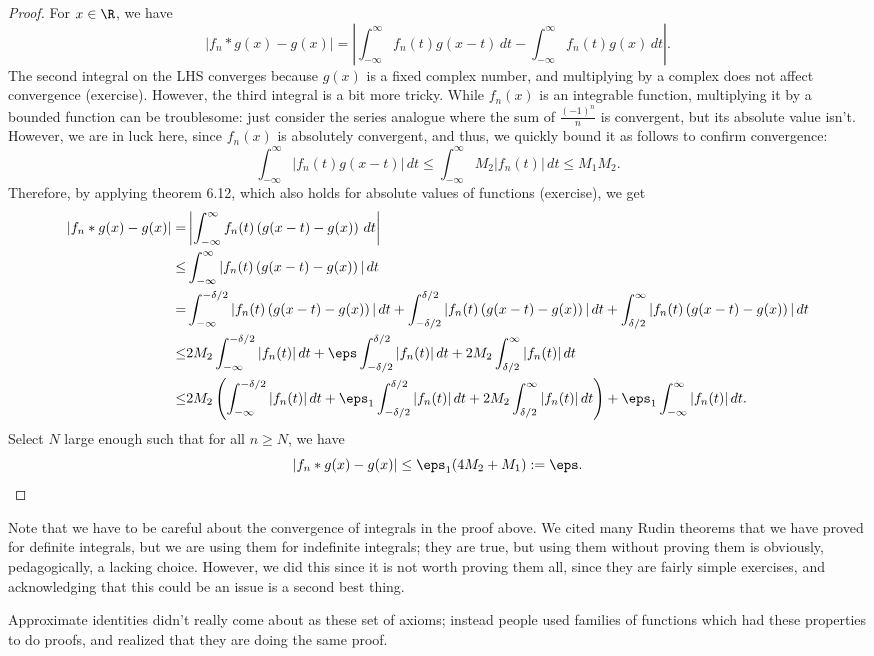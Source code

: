 \begin{proof}
	For \(x\in\R\), we have 
	\begin{equation*}
		|f_n\ast g(x)-g(x)|=\left|\int_{-\infty}^{\infty}f_n(t)g(x-t) \, dt-\int_{-\infty}^{\infty}f_n(t)g(x) \, dt\right|.
	\end{equation*}
	The second integral on the LHS converges because \(g(x)\) is a fixed complex number, and multiplying by a complex does not affect convergence (exercise). However, the third integral is a bit more tricky. While \(f_n(x)\) is an integrable function, multiplying it by a bounded function can be troublesome: just consider the series analogue where the sum of \(\displaystyle\frac{(-1)^n}{n}\) is convergent, but its absolute value isn't. However, we are in luck here, since \(f_n(x)\) is absolutely convergent, and thus, we quickly bound it as follows to confirm convergence:
	\begin{equation*}
		\int_{-\infty}^{\infty}|f_n(t)g(x-t)| \, dt\leq \int_{-\infty}^{\infty}M_2|f_n(t)| \, dt\leq M_1M_2.
	\end{equation*}
	Therefore, by applying theorem 6.12, which also holds for absolute values of functions (exercise), we get
	\begin{align*}
		|f_n\ast g(x)-g(x)|=&\left|\int_{-\infty}^{\infty}f_n(t)\left(g(x-t)-g(x)\right) \, dt\right|\\
		\leq&\int_{-\infty}^{\infty}|f_n(t)\left(g(x-t)-g(x)\right)| \, dt\\
		=&\int_{-\infty}^{-\delta/2}|f_n(t)\left(g(x-t)-g(x)\right)| \, dt+\int_{-\delta/2}^{\delta/2}|f_n(t)\left(g(x-t)-g(x)\right)| \, dt+\int_{\delta/2}^{\infty}|f_n(t)\left(g(x-t)-g(x)\right)| \, dt\\
		\leq& 2M_2\int_{-\infty}^{-\delta/2}|f_n(t)| \, dt+\eps\int_{-\delta/2}^{\delta/2}|f_n(t)| \, dt+2M_2\int_{\delta/2}^{\infty}|f_n(t)| \, dt\\
		\leq&2M_2\left(\int_{-\infty}^{-\delta/2}|f_n(t)| \, dt+\eps_1\int_{-\delta/2}^{\delta/2}|f_n(t)| \, dt+2M_2\int_{\delta/2}^{\infty}|f_n(t)| \, dt\right)+\eps_1\int_{-\infty}^{\infty}|f_n(t)| \, dt.
	\end{align*}
	Select \(N\) large enough such that for all \(n\geq N\), we have 
	\begin{equation*}
		|f_n\ast g(x)-g(x)|\leq\eps_1(4M_2+M_1):=\eps.	
	\end{equation*}
\end{proof}
\begin{note}
	Note that we have to be careful about the convergence of integrals in the proof above. We cited many Rudin theorems that we have proved for definite integrals, but we are using them for indefinite integrals; they are true, but using them without proving them is obviously, pedagogically, a lacking choice. However, we did this since it is not worth proving them all, since they are fairly simple exercises, and acknowledging that this could be an issue is a second best thing.
\end{note}
\begin{note}
	Approximate identities didn't really come about as these set of axioms; instead people used families of functions which had these properties to do proofs, and realized that they are doing the same proof.
\end{note}